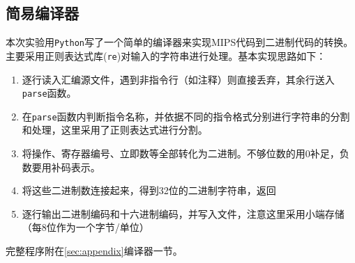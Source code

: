 
\subsection{简易编译器}
\qquad 本次实验用\verb'Python'写了一个简单的编译器来实现MIPS代码到二进制代码的转换。主要采用正则表达式库(\verb're')对输入的字符串进行处理。基本实现思路如下：
\begin{enumerate}
    \item 逐行读入汇编源文件，遇到非指令行（如注释）则直接丢弃，其余行送入\verb'parse'函数。
    \item 在\verb'parse'函数内判断指令名称，并依据不同的指令格式分别进行字符串的分割和处理，这里采用了正则表达式进行分割。
    \item 将操作、寄存器编号、立即数等全部转化为二进制。不够位数的用0补足，负数要用补码表示。
    \item 将这些二进制数连接起来，得到32位的二进制字符串，返回
    \item 逐行输出二进制编码和十六进制编码，并写入文件，注意这里采用小端存储（每8位作为一个字节/单位）
\end{enumerate}
\par 完整程序附在\ref{sec:appendix}编译器一节。